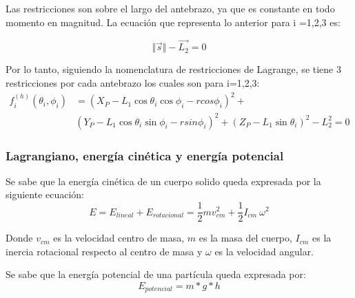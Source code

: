                 
                \begin{FlushLeft}
                Las restricciones son sobre el largo del antebrazo, ya que es constante en todo momento en magnitud. La ecuación que representa lo anterior para i =1,2,3 es: 
                \end{FlushLeft}
                
                \begin{FlushLeft}
                 \[  \Vert \overrightarrow{s} \Vert -\overrightarrow{L_{2}}=0 \] 
                \end{FlushLeft}
                Por lo tanto, siguiendo la nomenclatura de restricciones de Lagrange, se tiene 3 restricciones por cada antebrazo los cuales son para i=1,2,3: 
                \begin{align*}
                 f_{i}^{ \left( h \right) } \left(  \theta _{i}, \phi _{i} \right) &= \left( X_{P}-L_{1}\cos  \theta _{i}\cos  \phi _{i}- rcos \phi _{i} \right) ^{2}+ \\
                 &\left( Y_{P}-L_{1}\cos  \theta _{i}\sin  \phi _{i}- rsin \phi _{i} \right) ^{2}+ \left( Z_{P}-L_{1}\sin  \theta _{i} \right) ^{2}-L_{2}^{2}=0  
                \end{align*}
            

         \newpage

            \subsubsection{Lagrangiano, energía cinética y energía potencial}

                Se sabe que la energía cinética de un cuerpo solido queda expresada por la siguiente ecuación: 
                \begin{equation}
                    E=E_{lineal}+E_{rotacional}=\frac{1}{2}mv_{cm}^{2}+\frac{1}{2}I_{cm}~ \omega ^{2} 
                    \label{eq:energia_cine_anexoi_ma_1}
                \end{equation}
                 
                Donde  \( v_{cm} \)  es la velocidad centro de masa,  \( m \)  es la masa del cuerpo,  \( I_{cm} \)  es la inercia rotacional respecto al centro de masa y  \(  \omega  \)  es la velocidad angular.
                
                Se sabe que la energía potencial de una partícula queda expresada por:
                \begin{equation}
                    E_{potencial}=m\ast g \ast h
                    \label{eq:energia_cine_anexoi_ma_2}
                \end{equation}

